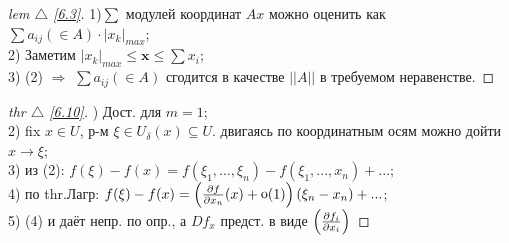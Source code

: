 
\begin{minipage}[]{0.45\textwidth}
\begin{proof}[
lem $\triangle$
\eqref{6.3}]

\phantom{42}
\noindent

1)$\sum$ модулей координат $A x$ можно оценить как $\sum a_{i j} (\in A) \cdot |x_k|_{max}$;\\
2) Заметим $ |x_k|_{max} \leq \textbf{x} \leq \sum x_i$;\\
3) (2) $\Rightarrow$  $\sum a_{i j} (\in A)$ сгодится
в качестве $||A||$ в требуемом неравенстве.

\end{proof}


\begin{proof}[
thr $\triangle$
\eqref{6.10}]

\phantom{42}
) Дост. для $m=1$;\\
2) fix $x \in U$, р-м $\xi \in U_\delta (x) \subseteq U$. двигаясь по координатным осям можно дойти $x \to \xi$;\\
3) из (2): $f(\xi) - f(x) = f(\xi_1,..., \xi_n) -f(\xi_1,...,x_n)+...$;\\
4) по thr.Лагр: $f(\xi) - f(x) = \left(\frac{\partial f}{\partial x_n}(x) + \mathop{\mathrm{o}}\nolimits(1)\right)(\xi_n - x_n) + ...$;\\
5) (4) и даёт непр. по опр., а $D f_x$ предст. в виде $\left(\frac{\partial f_i}{\partial x_i}\right)$
\end{proof}
\end{minipage}
\hfill
